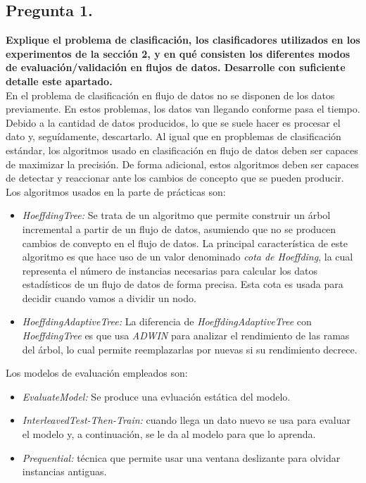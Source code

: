 \documentclass[11pt]{article}
\begin{document}
\newpage
\subsection{Pregunta 1.}

\textbf{Explique el problema de clasificación, los clasificadores utilizados en los experimentos de la sección 2, y en qué consisten los diferentes modos de evaluación/validación en flujos de datos. Desarrolle con suficiente detalle este apartado.} \\

En el problema de clasificación en flujo de datos no se disponen de los datos previamente. En estos problemas, los datos van llegando conforme pasa el tiempo. Debido a la cantidad de datos producidos, lo que se suele hacer es procesar el dato y, seguídamente, descartarlo. Al igual que en propblemas de clasificación estándar, los algoritmos usado en clasificación en flujo de datos deben ser capaces de maximizar la precisión. De forma adicional, estos algoritmos deben ser capaces de detectar y reaccionar ante los cambios de concepto que se pueden producir. \\

Los algoritmos usados en la parte de prácticas son: 

\begin{itemize}
	\item \textit{HoeffdingTree:} Se trata de un algoritmo que permite construir un árbol incremental a partir de un flujo de datos, asumiendo que  no se producen cambios de convepto en el flujo de datos. La principal característica de este algoritmo es que hace uso de un valor denominado \textit{cota de Hoeffding}, la cual representa el número de instancias necesarias para calcular los datos estadísticos de un flujo de datos de forma precisa. Esta cota es usada para decidir cuando vamos a dividir un nodo. 
	\item \textit{HoeffdingAdaptiveTree:} La diferencia de \textit{HoeffdingAdaptiveTree} con \textit{HoeffdingTree} es que usa \textit{ADWIN} para analizar el rendimiento de las ramas del árbol, lo cual permite reemplazarlas por nuevas si su rendimiento decrece.
\end{itemize}

Los modelos de evaluación empleados son:

\begin{itemize}
	\item \textit{EvaluateModel:} Se produce una evluación estática del modelo.
	\item \textit{InterleavedTest-Then-Train:} cuando llega un dato nuevo se usa para evaluar el modelo y, a continuación, se le da al modelo para que lo aprenda.
	\item \textit{Prequential:} técnica que permite usar una ventana deslizante para olvidar instancias antiguas.
\end{itemize}
\end{document}
